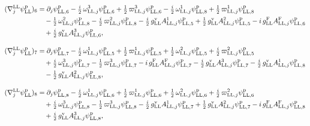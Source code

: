 \documentclass[
  10pt,
]{article}
\begin{document}
\[\begin{aligned}
(\nabla^{\rm LL}_j\psi^{\rm p}_{\rm LL})_6&=\partial_j\psi^{\rm p}_{{\rm LL},6}-\tfrac{i}{2}\,\omega^{3}_{{\rm LL},j}\psi^{\rm p}_{{\rm LL},6}+\tfrac{1}{2}\,\varpi^{3}_{{\rm LL},j}\psi^{\rm p}_{{\rm LL},6}-\tfrac{i}{2}\,\omega^{1}_{{\rm LL},j}\psi^{\rm p}_{{\rm LL},8}+\tfrac{1}{2}\,\varpi^{1}_{{\rm LL},j}\psi^{\rm p}_{{\rm LL},8}\\
&\quad -\tfrac{1}{2}\,\omega^{2}_{{\rm LL},j}\psi^{\rm p}_{{\rm LL},8}-\tfrac{i}{2}\,\varpi^{2}_{{\rm LL},j}\psi^{\rm p}_{{\rm LL},8}-\tfrac{i}{2}\,g^{\rm v}_{\rm LL}A^{1}_{{\rm LL},j}\psi^{\rm p}_{{\rm LL},5}+\tfrac{1}{2}\,g^{\rm v}_{\rm LL}A^{2}_{{\rm LL},j}\psi^{\rm p}_{{\rm LL},5}-i\,g^{\rm F}_{\rm LL}A^{\rm F}_{{\rm LL},j}\psi^{\rm p}_{{\rm LL},6}\\
&\quad +\tfrac{i}{2}\,g^{\rm v}_{\rm LL}A^{3}_{{\rm LL},j}\psi^{\rm p}_{{\rm LL},6},
\end{aligned}\]

\[\begin{aligned}
(\nabla^{\rm LL}_j\psi^{\rm p}_{\rm LL})_7&=\partial_j\psi^{\rm p}_{{\rm LL},7}-\tfrac{i}{2}\,\omega^{1}_{{\rm LL},j}\psi^{\rm p}_{{\rm LL},5}+\tfrac{1}{2}\,\varpi^{1}_{{\rm LL},j}\psi^{\rm p}_{{\rm LL},5}+\tfrac{1}{2}\,\omega^{2}_{{\rm LL},j}\psi^{\rm p}_{{\rm LL},5}+\tfrac{i}{2}\,\varpi^{2}_{{\rm LL},j}\psi^{\rm p}_{{\rm LL},5}\\
&\quad +\tfrac{i}{2}\,\omega^{3}_{{\rm LL},j}\psi^{\rm p}_{{\rm LL},7}-\tfrac{1}{2}\,\varpi^{3}_{{\rm LL},j}\psi^{\rm p}_{{\rm LL},7}-i\,g^{\rm F}_{\rm LL}A^{\rm F}_{{\rm LL},j}\psi^{\rm p}_{{\rm LL},7}-\tfrac{i}{2}\,g^{\rm v}_{\rm LL}A^{3}_{{\rm LL},j}\psi^{\rm p}_{{\rm LL},7}-\tfrac{i}{2}\,g^{\rm v}_{\rm LL}A^{1}_{{\rm LL},j}\psi^{\rm p}_{{\rm LL},8}\\
&\quad -\tfrac{1}{2}\,g^{\rm v}_{\rm LL}A^{2}_{{\rm LL},j}\psi^{\rm p}_{{\rm LL},8},
\end{aligned}\]

\[\begin{aligned}
(\nabla^{\rm LL}_j\psi^{\rm p}_{\rm LL})_8&=\partial_j\psi^{\rm p}_{{\rm LL},8}-\tfrac{i}{2}\,\omega^{1}_{{\rm LL},j}\psi^{\rm p}_{{\rm LL},6}+\tfrac{1}{2}\,\varpi^{1}_{{\rm LL},j}\psi^{\rm p}_{{\rm LL},6}+\tfrac{1}{2}\,\omega^{2}_{{\rm LL},j}\psi^{\rm p}_{{\rm LL},6}+\tfrac{i}{2}\,\varpi^{2}_{{\rm LL},j}\psi^{\rm p}_{{\rm LL},6}\\
&\quad +\tfrac{i}{2}\,\omega^{3}_{{\rm LL},j}\psi^{\rm p}_{{\rm LL},8}-\tfrac{1}{2}\,\varpi^{3}_{{\rm LL},j}\psi^{\rm p}_{{\rm LL},8}-\tfrac{i}{2}\,g^{\rm v}_{\rm LL}A^{1}_{{\rm LL},j}\psi^{\rm p}_{{\rm LL},7}+\tfrac{1}{2}\,g^{\rm v}_{\rm LL}A^{2}_{{\rm LL},j}\psi^{\rm p}_{{\rm LL},7}-i\,g^{\rm F}_{\rm LL}A^{\rm F}_{{\rm LL},j}\psi^{\rm p}_{{\rm LL},8}\\
&\quad +\tfrac{i}{2}\,g^{\rm v}_{\rm LL}A^{3}_{{\rm LL},j}\psi^{\rm p}_{{\rm LL},8},
\end{aligned}\]
\end{document}
